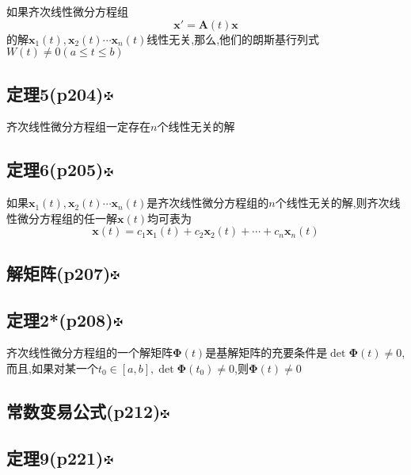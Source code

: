 \documentclass[11pt, a4paper, UTF8]{ctexart}
\begin{document}
如果齐次线性微分方程组
$$\bm{x}'=\bm{A}(t)\bm x$$
的解$\bm x_1(t),\bm x_2(t)\cdots\bm x_n(t)$线性无关,那么,他们的朗斯基行列式$W(t)\not=0(a\le t\le b)$\\
\begin{Large}
\section{定理5(p204)\protect\hyperlink{catalog}{$\fuck$}}
\end{Large}
齐次线性微分方程组一定存在$n$个线性无关的解\\
\begin{Large}
\section{定理6(p205)\protect\hyperlink{catalog}{$\fuck$}}
\end{Large}
如果$\bm x_1(t),\bm x_2(t)\cdots\bm x_n(t)$是齐次线性微分方程组的$n$个线性无关的解,则齐次线性微分方程组的任一解$\bm x(t)$均可表为
$$\bm x(t)=c_1\bm x_1(t)+c_2\bm x_2(t)+\cdots+c_n\bm x_n(t)$$
\begin{Large}
\section{解矩阵(p207)\protect\hyperlink{catalog}{$\fuck$}}
\end{Large}
\begin{Large}
\section{定理2*(p208)\protect\hyperlink{catalog}{$\fuck$}}
\end{Large}
齐次线性微分方程组的一个解矩阵$\bm\Phi(t)$是基解矩阵的充要条件是$\det\bm\Phi(t)\not=0$,而且,如果对某一个$t_0\in[a,b],\det\bm\Phi(t_0)\not=0$,则$\bm\Phi(t)\not=0$\\
\begin{Large}
\section{常数变易公式(p212)\protect\hyperlink{catalog}{$\fuck$}}
\end{Large}
\begin{Large}
\section{定理9(p221)\protect\hyperlink{catalog}{$\fuck$}}
\end{Large}
\end{document}
